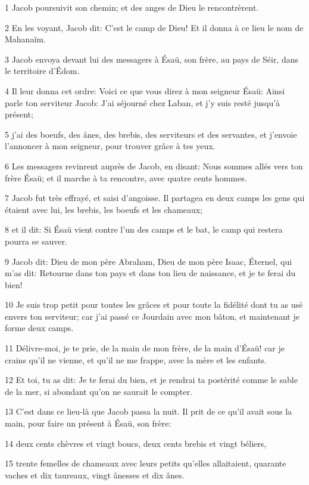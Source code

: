 \par 1 Jacob poursuivit son chemin; et des anges de Dieu le rencontrèrent.
\par 2 En les voyant, Jacob dit: C'est le camp de Dieu! Et il donna à ce lieu le nom de Mahanaïm.
\par 3 Jacob envoya devant lui des messagers à Ésaü, son frère, au pays de Séir, dans le territoire d'Édom.
\par 4 Il leur donna cet ordre: Voici ce que vous direz à mon seigneur Ésaü: Ainsi parle ton serviteur Jacob: J'ai séjourné chez Laban, et j'y suis resté jusqu'à présent;
\par 5 j'ai des boeufs, des ânes, des brebis, des serviteurs et des servantes, et j'envoie l'annoncer à mon seigneur, pour trouver grâce à tes yeux.
\par 6 Les messagers revinrent auprès de Jacob, en disant: Nous sommes allés vers ton frère Ésaü; et il marche à ta rencontre, avec quatre cents hommes.
\par 7 Jacob fut très effrayé, et saisi d'angoisse. Il partagea en deux camps les gens qui étaient avec lui, les brebis, les boeufs et les chameaux;
\par 8 et il dit: Si Ésaü vient contre l'un des camps et le bat, le camp qui restera pourra se sauver.
\par 9 Jacob dit: Dieu de mon père Abraham, Dieu de mon père Isaac, Éternel, qui m'as dit: Retourne dans ton pays et dans ton lieu de naissance, et je te ferai du bien!
\par 10 Je suis trop petit pour toutes les grâces et pour toute la fidélité dont tu as usé envers ton serviteur; car j'ai passé ce Jourdain avec mon bâton, et maintenant je forme deux camps.
\par 11 Délivre-moi, je te prie, de la main de mon frère, de la main d'Ésaü! car je crains qu'il ne vienne, et qu'il ne me frappe, avec la mère et les enfants.
\par 12 Et toi, tu as dit: Je te ferai du bien, et je rendrai ta postérité comme le sable de la mer, si abondant qu'on ne saurait le compter.
\par 13 C'est dans ce lieu-là que Jacob passa la nuit. Il prit de ce qu'il avait sous la main, pour faire un présent à Ésaü, son frère:
\par 14 deux cents chèvres et vingt boucs, deux cents brebis et vingt béliers,
\par 15 trente femelles de chameaux avec leurs petits qu'elles allaitaient, quarante vaches et dix taureaux, vingt ânesses et dix ânes.
